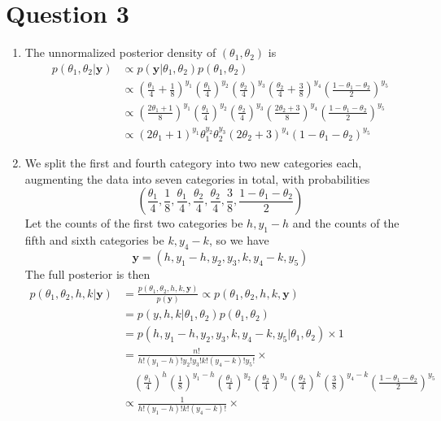 \documentclass[a4paper,12pt]{article}\usepackage[]{graphicx}\usepackage[]{color}
\newcommand{\by}{\mathbf{y}}
\begin{document}
\section*{Question 3}
\begin{enumerate}[label=(\alph*)]
\item The unnormalized posterior density of $(\theta_1,\theta_2)$ is 
\begin{align*}
p(\theta_1,\theta_2|\by)&\propto p(\by|\theta_1,\theta_2)p(\theta_1,\theta_2) \\
&\propto \left(\frac{\theta_1}{4}+\frac{1}{8}\right)^{y_1}\left(\frac{\theta_1}{4}\right)^{y_2}\left(\frac{\theta_2}{4}\right)^{y_3}\left(\frac{\theta_2}{4}+\frac{3}{8}\right)^{y_4}\left(\frac{1-\theta_1-\theta_2}{2}\right)^{y_5} \\
&\propto \left(\frac{2\theta_1+1}{8}\right)^{y_1}\left(\frac{\theta_1}{4}\right)^{y_2}\left(\frac{\theta_2}{4}\right)^{y_3}\left(\frac{2\theta_2+3}{8}\right)^{y_4}\left(\frac{1-\theta_1-\theta_2}{2}\right)^{y_5} \\
&\propto (2\theta_1+1)^{y_1}\theta_1^{y_2}\theta_2^{y_3}(2\theta_2+3)^{y_4}(1-\theta_1-\theta_2)^{y_5}
\end{align*}
\item We split the first and fourth category into two new categories each, augmenting the data into seven categories in total, with probabilities
$$\left(\frac{\theta_1}{4},\frac{1}{8},\frac{\theta_1}{4},\frac{\theta_2}{4},\frac{\theta_2}{4},\frac{3}{8},\frac{1-\theta_1-\theta_2}{2}\right)$$
Let the counts of the first two categories be $h,y_1-h$ and the counts of the fifth and sixth categories be $k,y_4-k$, so we have
$$\by=(h,y_1-h,y_2,y_3,k,y_4-k,y_5)$$
The full posterior is then
\begin{align*}
p(\theta_1,\theta_2,h,k|\by)&=\frac{p(\theta_1,\theta_2,h,k,\by)}{p(\by)}\propto p(\theta_1,\theta_2,h,k,\by)\\
&=p(y,h,k|\theta_1,\theta_2)p(\theta_1,\theta_2) \\
&= p(h,y_1-h,y_2,y_3,k,y_4-k,y_5|\theta_1,\theta_2)\times 1 \\
&=\frac{n!}{h!(y_1-h)!y_2!y_3!k!(y_4-k)!y_5!}\times \\
&\quad\left(\frac{\theta_1}{4}\right)^{h}\left(\frac{1}{8}\right)^{y_1-h}\left(\frac{\theta_1}{4}\right)^{y_2}\left(\frac{\theta_2}{4}\right)^{y_3}\left(\frac{\theta_2}{4}\right)^{k}\left(\frac{3}{8}\right)^{y_4-k}\left(\frac{1-\theta_1-\theta_2}{2}\right)^{y_5} \\
&\propto \frac{1}{h!(y_1-h)!k!(y_4-k)!}\times\\

\end{align*}
\end{enumerate}
\end{document}
